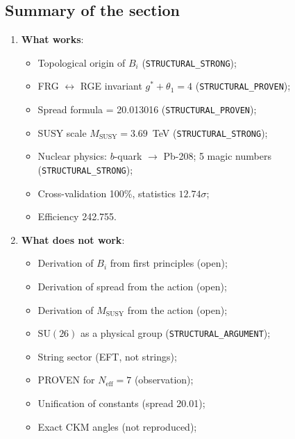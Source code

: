 \documentclass[11pt,a4paper]{article}
\newcommand{\SU}{\ensuremath{\mathrm{SU}}}
\theoremstyle{definition}
\begin{document}
\subsection{Summary of the section}
\label{subsec:disc-summary}

\begin{enumerate}
    \item \textbf{What works}:
          \begin{itemize}
              \item Topological origin of $B_i$
                    (\texttt{STRUCTURAL\_STRONG});
              \item FRG $\leftrightarrow$ RGE invariant
                    $g^* + \theta_1 = 4$ (\texttt{STRUCTURAL\_PROVEN});
              \item Spread formula = 20.013016
                    (\texttt{STRUCTURAL\_PROVEN});
              \item SUSY scale $M_{\text{SUSY}} = 3.69$~TeV
                    (\texttt{STRUCTURAL\_STRONG});
              \item Nuclear physics: $b$-quark $\to$ Pb-208;
                    5 magic numbers (\texttt{STRUCTURAL\_STRONG});
              \item Cross-validation 100\%,
                    statistics $12.74\sigma$;
              \item Efficiency 242.755.
          \end{itemize}
    \item \textbf{What does not work}:
          \begin{itemize}
              \item Derivation of $B_i$ from first principles (open);
              \item Derivation of spread from the action (open);
              \item Derivation of $M_{\text{SUSY}}$ from the action (open);
              \item $\SU(26)$ as a physical group
                    (\texttt{STRUCTURAL\_ARGUMENT});
              \item String sector (EFT, not strings);
              \item PROVEN for $N_{\text{eff}} = 7$ (observation);
              \item Unification of constants (spread 20.01);
              \item Exact CKM angles (not reproduced);

\end{itemize}
\end{enumerate}
\end{document}
